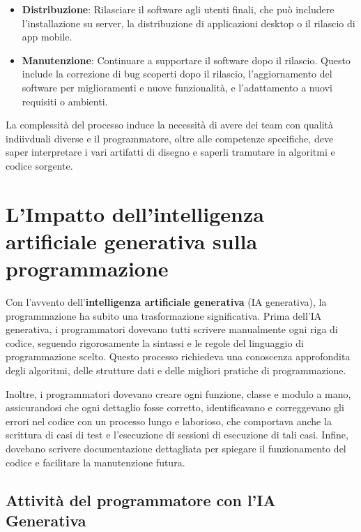 \documentclass[
  letterpaper,
]{scrbook}
\begin{document}
\begin{itemize}
  \begin{itemize}
  \item
    \textbf{Distribuzione}: Rilasciare il software agli utenti finali,
    che può includere l'installazione su server, la distribuzione di
    applicazioni desktop o il rilascio di app mobile.
  \item
    \textbf{Manutenzione}: Continuare a supportare il software dopo il
    rilascio. Questo include la correzione di bug scoperti dopo il
    rilascio, l'aggiornamento del software per miglioramenti e nuove
    funzionalità, e l'adattamento a nuovi requisiti o ambienti.
  \end{itemize}
\end{itemize}

La complessità del processo induce la necessità di avere dei team con
qualità indiivduali diverse e il programmatore, oltre alle competenze
specifiche, deve saper interpretare i vari artifatti di disegno e
saperli tramutare in algoritmi e codice sorgente.

\section{L'Impatto dell'intelligenza artificiale generativa sulla
programmazione}\label{limpatto-dellintelligenza-artificiale-generativa-sulla-programmazione}

Con l'avvento dell'\textbf{intelligenza artificiale generativa} (IA
generativa), la programmazione ha subito una trasformazione
significativa. Prima dell'IA generativa, i programmatori dovevano tutti
scrivere manualmente ogni riga di codice, seguendo rigorosamente la
sintassi e le regole del linguaggio di programmazione scelto. Questo
processo richiedeva una conoscenza approfondita degli algoritmi, delle
strutture dati e delle migliori pratiche di programmazione.

Inoltre, i programmatori dovevano creare ogni funzione, classe e modulo
a mano, assicurandosi che ogni dettaglio fosse corretto, identificavano
e correggevano gli errori nel codice con un processo lungo e laborioso,
che comportava anche la scrittura di casi di test e l'esecuzione di
sessioni di esecuzione di tali casi. Infine, dovebano scrivere
documentazione dettagliata per spiegare il funzionamento del codice e
facilitare la manutenzione futura.

\subsection{Attività del programmatore con l'IA
Generativa}\label{attivituxe0-del-programmatore-con-lia-generativa}
\end{document}
